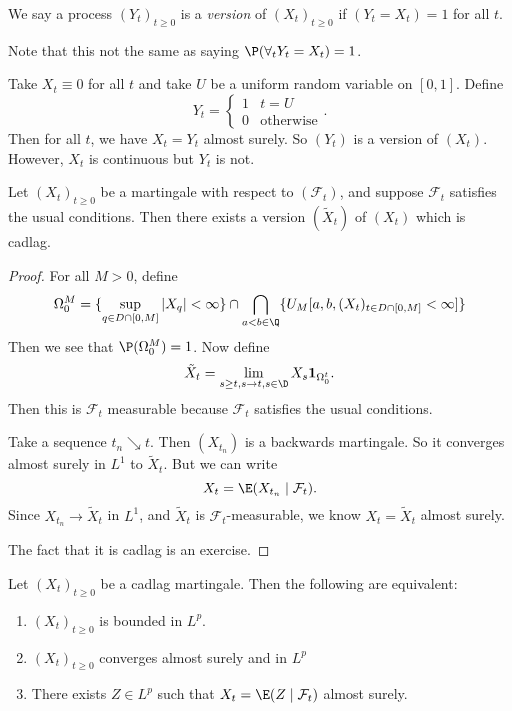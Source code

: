 \documentclass[a4paper]{article}
\begin{document}
\begin{defi}[Version]
  We say a process $(Y_t)_{t \geq 0}$ is a \emph{version} of $(X_t)_{t \geq 0}$ if $(Y_t = X_t) = 1$ for all $t$.
\end{defi}

Note that this not the same as saying $\P(\forall_t Y_t = X_t) = 1$.

\begin{eg}
  Take $X_t \equiv 0$ for all $t$ and take $U$ be a uniform random variable on $[0, 1]$. Define
  \[
    Y_t =
    \begin{cases}
      1 & t = U\\
      0 & \text{otherwise}
    \end{cases}.
  \]
  Then for all $t$, we have $X_t = Y_t$ almost surely. So $(Y_t)$ is a version of $(X_t)$. However, $X_t$ is continuous but $Y_t$ is not.
\end{eg}
\begin{thm}
  Let $(X_t)_{t \geq 0}$ be a martingale with respect to $(\mathcal{F}_t)$, and suppose $\mathcal{F}_t$ satisfies the usual conditions. Then there exists a version $(\tilde{X}_t)$ of $(X_t)$ which is cadlag.
\end{thm}

\begin{proof}
  For all $M > 0$, define
  \[
    \Omega_0^M = \{\sup_{q \in D \cap [0, M]} |X_q| < \infty\} \cap \bigcap_{a < b \in \Q} \{U_M[a, b, (X_t)_{t \in D \cap [0, M]} < \infty]\}
  \]
  Then we see that $\P(\Omega_0^M) = 1$. Now define
  \[
    \tilde{X}_t = \lim_{s \geq t, s \to t, s \in \D} X_s \mathbf{1}_{\Omega^t_0}.
  \]
  Then this is $\mathcal{F}_t$ measurable because $\mathcal{F}_t$ satisfies the usual conditions.

  Take a sequence $t_n \searrow t$. Then $(X_{t_n})$ is a backwards martingale. So it converges almost surely in $L^1$ to $\tilde{X}_t$. But we can write
  \[
    X_t = \E (X_{t_n} \mid \mathcal{F}_t).
  \]
  Since $X_{t_n} \to \tilde{X}_t$ in $L^1$, and $\tilde{X}_t$ is $\mathcal{F}_t$-measurable, we know $X_t = \tilde{X}_t$ almost surely.

  The fact that it is cadlag is an exercise.
\end{proof}

\begin{thm}
  Let $(X_t)_{t \geq 0}$ be a cadlag martingale. Then the following are equivalent:
  \begin{enumerate}
    \item $(X_t)_{t \geq 0}$ is bounded in $L^p$.
    \item $(X_t)_{t \geq 0}$ converges almost surely and in $L^p$
    \item There exists $Z \in L^p$ such that $X_t = \E (Z \mid \mathcal{F}_t)$ almost surely.
  \end{enumerate}
\end{thm}
\end{document}

